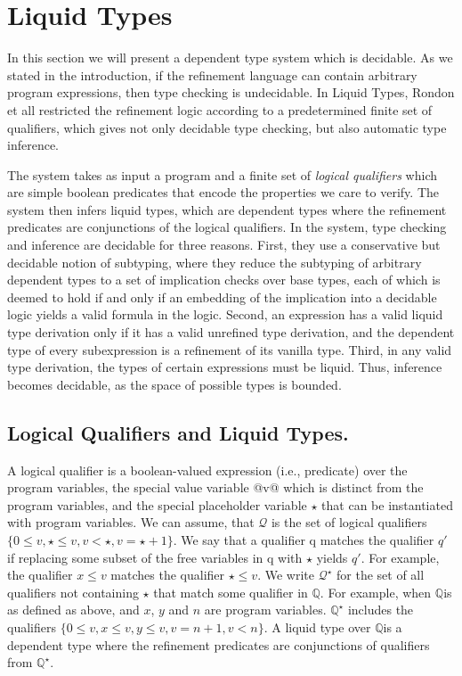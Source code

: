 	\newcommand\qset{\ensuremath{\mathbb{Q}}}

\section{Liquid Types}\label{sec:liquid}


In this section we will present a dependent type system which is decidable.
As we stated in the introduction, if the refinement language can contain arbitrary 
program expressions, then type checking is undecidable.
%
In Liquid Types\cite{LiquidPLDI08},  Rondon et all restricted the refinement logic according to a predetermined 
finite set of qualifiers,  which gives not only decidable type checking, but also automatic
type inference.



The system takes as input a program and 
a finite set of \textit{logical qualifiers}
which are simple boolean predicates 
that encode the properties we care to verify. 
The system then infers
liquid types, which are dependent types where the refinement predicates are conjunctions of the logical qualifiers.
In the system, type checking and inference are decidable for
three reasons. 
%
First, they use a conservative but decidable
notion of subtyping, where they reduce the subtyping of arbitrary
dependent types to a set of implication checks over base types,
each of which is deemed to hold if and only if an embedding of
the implication into a decidable logic yields a valid formula in
the logic. 
%
Second, an expression has a valid liquid type derivation
only if it has a valid unrefined type derivation, and the dependent 
type of every subexpression is a refinement of its vanilla type. 
%
Third, in any valid type derivation, the types of certain expressions
must be liquid. Thus, inference becomes decidable, as the space of
possible types is bounded. 


\subsection{Logical Qualifiers and Liquid Types.}

A logical qualifier is a
boolean-valued expression (i.e., predicate) over the program variables, 
the special value variable @v@ which is distinct from the
program variables, and the special placeholder variable $\star$ that
can be instantiated with program variables. 
We can assume, that $\mathcal{Q}$ is the set of logical qualifiers
$\{0 \leq v, \star \leq v, v < \star,  v = \star + 1\}$. 
%
We say that
a qualifier q matches the qualifier $q'$
if replacing some subset of
the free variables in q with $\star$ yields $q'$.
For example, the qualifier
$x \leq v$ matches the qualifier $\star \leq v$. 
We write $\mathcal{Q}^\star$
for the set of all
qualifiers not containing $\star$ that match some qualifier in \qset. 
For example, when \qset is as defined as above, 
and $x$, $y$ and $n$ are program variables.
$\qset^\star$
includes the qualifiers
$\{0 \leq v, x \leq v, y \leq v, v = n + 1, v <n\}$. 
A liquid type over \qset is a dependent type where the refinement predicates are
conjunctions of qualifiers from $\qset ^ \star$.

